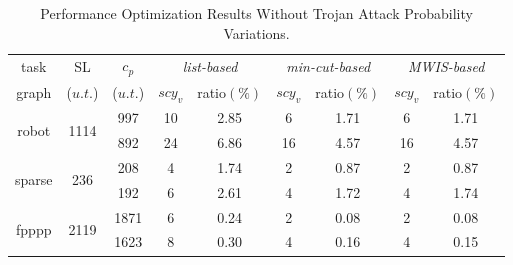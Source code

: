 \documentclass[10pt,journal]{IEEEtran}
\begin{document}
\begin{table}[!t]
\renewcommand{\arraystretch}{1.1}
\caption{Performance Optimization Results Without Trojan Attack Probability Variations.}
\centering
\begin{tabular}{c|c|c|c|c|c|c|c|c}
\hline
\hline
task                             &SL           &$c_p$        & \multicolumn{2}{c|}{\textit{list-based}}        &\multicolumn{2}{c|}{\textit{min-cut-based}}   &\multicolumn{2}{c}{\textit{MWIS-based}}        \\  \cline{4-5} \cline{6-7} \cline{8-9}
graph                                                   &\hspace*{-1em}($u.t.$)\hspace*{-1em}         &($u.t.$)       &$scy_v$     & \hspace*{-0.6em}ratio$(\%)$\hspace*{-0.6em}  &$scy_v$     &\hspace*{-0.6em}ratio$(\%)$\hspace*{-0.6em}   &$scy_v$     &\hspace*{-0.6em}ratio$(\%)$\hspace*{-0.6em}   \\

\hline
\hline

\multicolumn{1}{c|}{\multirow{2}{*}{robot}}               &\multicolumn{1}{c|}{\multirow{2}{*}{\hspace*{-0.5em}1114\hspace*{-0.5em}}}      &997  &10     &2.85   &6   &1.71   &6   &1.71    \\
   &      &892   &24  &6.86  &16   &4.57    &16  &4.57 \\

\hline
\multicolumn{1}{c|}{\multirow{2}{*}{sparse}}              &\multicolumn{1}{c|}{\multirow{2}{*}{236}}        &208  &4  &1.74   &2   &0.87    &2   &0.87   \\
   &     &192   &6  &2.61  &4   &1.72  &4    &1.74  \\

\hline
\multicolumn{1}{c|}{\multirow{2}{*}{fpppp}}            &\multicolumn{1}{c|}{\multirow{2}{*}{\hspace*{-0.5em}2119\hspace*{-0.5em}}}  &\hspace*{-0.5em}1871\hspace*{-0.5em}  &6 &0.24  &2   &0.08  &2   &0.08  \\
   &       &\hspace*{-0.5em}1623\hspace*{-0.5em}   &8 &0.30   &4   &0.16  &4  &0.15 \\


\end{tabular}
\end{table}
\end{document}
